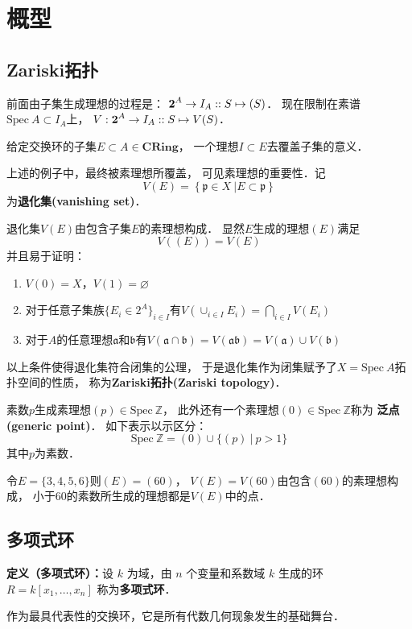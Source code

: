 \chapter{概型}

\section{Zariski拓扑}

前面由子集生成理想的过程是：
$\textbf 2^A \to I_A :: S \mapsto (S)$．
现在限制在素谱$\text{Spec} \ A \subset I_A$上，
$V: \textbf 2^A \to I_A :: S \mapsto V(S)$．


给定交换环的子集$E \subset A \in\textbf{CRing}$，
一个理想$I \subset E$去覆盖子集的意义．

  上述的例子中，最终被素理想所覆盖，
可见素理想的重要性．记
$$
V(E) = \left\{ \mathfrak p \in X \ | E \subset \mathfrak p \right\}
$$
为\textbf{退化集(vanishing set)}．


退化集$V(E)$由包含子集$E$的素理想构成．
显然$E$生成的理想$(E)$满足
$$
V((E)) = V(E)
$$
并且易于证明：
\begin{enumerate}
\item $V(0) = X$，$V(1)=\varnothing$
\item 对于任意子集族$\{E_i\in 2^A\}_{i\in I}$有$V(\cup_{i\in I} E_i) = \bigcap_{i\in I} V(E_i)$
\item 对于$A$的任意理想$\mathfrak a$和$\mathfrak b$有$V(\mathfrak a \cap \mathfrak b) = V(\mathfrak a \mathfrak b) = V(\mathfrak a) \cup V(\mathfrak b)$
\end{enumerate}
以上条件使得退化集符合闭集的公理，
于是退化集作为闭集赋予了$X=\text{Spec} \ A$拓扑空间的性质，
称为\textbf{Zariski拓扑(Zariski topology)}．

\begin{example}

素数$p$生成素理想$(p) \in \text{Spec} \ \mathbb Z$，
此外还有一个素理想$(0) \in \text{Spec} \ \mathbb Z$称为
\textbf{泛点(generic point)}．
如下表示以示区分：
$$
\text{Spec} \ \mathbb Z = (0) \cup \{(p) \ | \ p > 1\}
$$
其中$p$为素数．
\end{example}

\begin{example}
令$E=\{3,4,5,6\}$则$(E)=(60)$，
$V(E)=V(60)$由包含$(60)$的素理想构成，
小于$60$的素数所生成的理想都是$V(E)$中的点．
\end{example}


\section{多项式环}
\begin{framed}
\noindent\textbf{定义（多项式环）：}设 $k$ 为域，由 $n$ 个变量和系数域 $k$ 生成的环 $R = k[x_1, \dots, x_n]$ 称为\textbf{多项式环}．
\end{framed}
作为最具代表性的交换环，它是所有代数几何现象发生的基础舞台．

